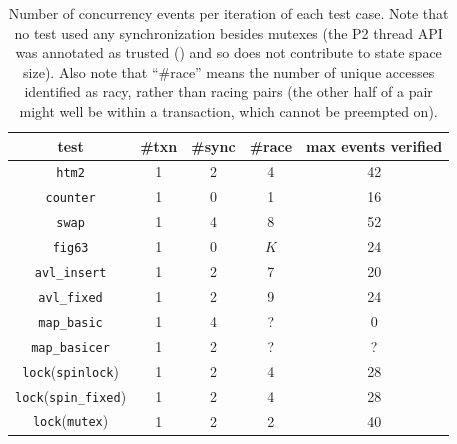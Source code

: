 \begin{table}[h]
	\begin{center}
		\small
		\begin{tabular}{c||c|c|c||c}
			{\bf test} & {\bf \#txn} & {\bf \#sync} & {\bf \#race} & {\bf max events verified} \\
			\hline
			{\tt htm2}		& 1	& 2	& 4	& 42	\\ %
			{\tt counter}		& 1	& 0	& 1	& 16	\\ %
			{\tt swap}		& 1	& 4	& 8	& 52	\\ %
			{\tt fig63}		& 1	& 0	& $K$	& 24	\\ %
			{\tt avl\_insert}	& 1	& 2	& 7	& 20	\\ %
			{\tt avl\_fixed}	& 1	& 2	& 9	& 24	\\ %
			{\tt map\_basic}	& 1	& 4	& ?	& 0	\\ %
			{\tt map\_basicer}	& 1	& 2	& ?	& ?	\\

			{\tt lock}({\tt spinlock})	& 1	& 2	& 4	& 28	\\ %
			{\tt lock}({\tt spin\_fixed})	& 1	& 2	& 4	& 28	\\ %
			{\tt lock}({\tt mutex})		& 1	& 2	& 2	& 40	\\ %
		\end{tabular}
	\end{center}
	\caption{Number of concurrency events per iteration of each test case.
	Note that no test used any synchronization besides mutexes %
	(the P2 thread API was annotated as trusted (\sect{\ref{sec:landslide-config-landslide}})
	and so does not contribute to state space size).
	Also note that ``\#race'' means the number of unique accesses identified as racy,
	rather than racing pairs
	(the other half of a pair might well be within a transaction, which cannot be preempted on).
	}
	\label{tab:tm-test-case-evence}
\end{table}

